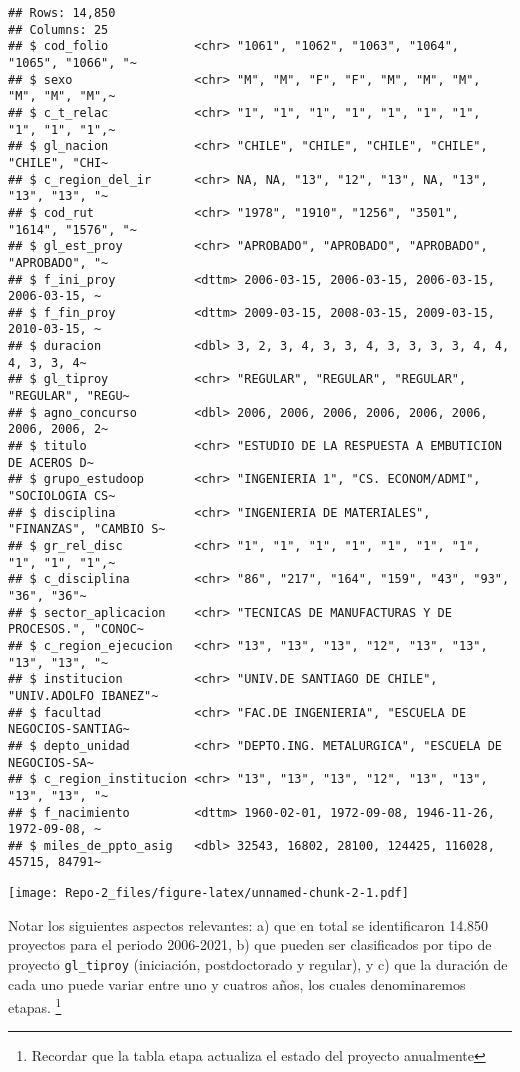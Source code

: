 \documentclass[
]{article}
\begin{document}
\begin{verbatim}
## Rows: 14,850
## Columns: 25
## $ cod_folio            <chr> "1061", "1062", "1063", "1064", "1065", "1066", "~
## $ sexo                 <chr> "M", "M", "F", "F", "M", "M", "M", "M", "M", "M",~
## $ c_t_relac            <chr> "1", "1", "1", "1", "1", "1", "1", "1", "1", "1",~
## $ gl_nacion            <chr> "CHILE", "CHILE", "CHILE", "CHILE", "CHILE", "CHI~
## $ c_region_del_ir      <chr> NA, NA, "13", "12", "13", NA, "13", "13", "13", "~
## $ cod_rut              <chr> "1978", "1910", "1256", "3501", "1614", "1576", "~
## $ gl_est_proy          <chr> "APROBADO", "APROBADO", "APROBADO", "APROBADO", "~
## $ f_ini_proy           <dttm> 2006-03-15, 2006-03-15, 2006-03-15, 2006-03-15, ~
## $ f_fin_proy           <dttm> 2009-03-15, 2008-03-15, 2009-03-15, 2010-03-15, ~
## $ duracion             <dbl> 3, 2, 3, 4, 3, 3, 4, 3, 3, 3, 3, 4, 4, 4, 3, 3, 4~
## $ gl_tiproy            <chr> "REGULAR", "REGULAR", "REGULAR", "REGULAR", "REGU~
## $ agno_concurso        <dbl> 2006, 2006, 2006, 2006, 2006, 2006, 2006, 2006, 2~
## $ titulo               <chr> "ESTUDIO DE LA RESPUESTA A EMBUTICION DE ACEROS D~
## $ grupo_estudoop       <chr> "INGENIERIA 1", "CS. ECONOM/ADMI", "SOCIOLOGIA CS~
## $ disciplina           <chr> "INGENIERIA DE MATERIALES", "FINANZAS", "CAMBIO S~
## $ gr_rel_disc          <chr> "1", "1", "1", "1", "1", "1", "1", "1", "1", "1",~
## $ c_disciplina         <chr> "86", "217", "164", "159", "43", "93", "36", "36"~
## $ sector_aplicacion    <chr> "TECNICAS DE MANUFACTURAS Y DE PROCESOS.", "CONOC~
## $ c_region_ejecucion   <chr> "13", "13", "13", "12", "13", "13", "13", "13", "~
## $ institucion          <chr> "UNIV.DE SANTIAGO DE CHILE", "UNIV.ADOLFO IBANEZ"~
## $ facultad             <chr> "FAC.DE INGENIERIA", "ESCUELA DE NEGOCIOS-SANTIAG~
## $ depto_unidad         <chr> "DEPTO.ING. METALURGICA", "ESCUELA DE NEGOCIOS-SA~
## $ c_region_institucion <chr> "13", "13", "13", "12", "13", "13", "13", "13", "~
## $ f_nacimiento         <dttm> 1960-02-01, 1972-09-08, 1946-11-26, 1972-09-08, ~
## $ miles_de_ppto_asig   <dbl> 32543, 16802, 28100, 124425, 116028, 45715, 84791~
\end{verbatim}

\texttt{[image: Repo-2\_files/figure-latex/unnamed-chunk-2-1.pdf]}

Notar los siguientes aspectos relevantes: a) que en total se
identificaron 14.850 proyectos para el periodo 2006-2021, b) que pueden
ser clasificados por tipo de proyecto \texttt{gl\_tiproy} (iniciación,
postdoctorado y regular), y c) que la duración de cada uno puede variar
entre uno y cuatros años, los cuales denominaremos etapas. \footnote{Recordar
  que la tabla etapa actualiza el estado del proyecto anualmente}
\end{document}
